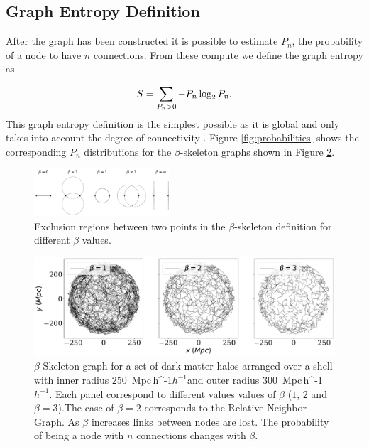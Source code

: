 \documentclass[fleqn,usenatbib]{mnras}
\newcommand{\Mpch}{\,{\rm Mpc}\,\ifmmode h^{-1}\else $h^{-1}$\fi}
\begin{document}
\subsection{Graph Entropy Definition}

After the graph has been constructed it is possible to estimate $P_n$, the probability of 
a node to have $n$ connections.
From these compute we define the graph entropy as

\begin{equation}
\centering
    S = \displaystyle\sum_{P_n>0}-P_n\log_2{P_n}.
    \label{ecuacionEntropia}
\end{equation}
%
This graph entropy definition is the simplest possible as it is global and only 
takes into account the degree of connectivity \citep{2012Entrp..14..559M}. 
Figure \ref{fig:probabilities} shows the corresponding $P_n$ distributions for the 
$\beta$-skeleton graphs shown in Figure \ref{fig:connectionsBeta}.




\begin{figure}
    \centering
    \includegraphics[width=0.45\textwidth]{betas.pdf}
   \caption{Exclusion regions between two points in the $\beta$-skeleton definition for
    different $\beta$ values.
 \label{fig:example}}  
\end{figure} 

\begin{figure}
    \centering
    \includegraphics[width=1.0\textwidth]{beta123_2.pdf}
    \caption{$\beta$-Skeleton graph for a set of dark matter halos arranged over a shell
    with inner radius $250$ \Mpch and outer radius $300$ \Mpch.
    Each panel correspond to different values values of $\beta$ ($1$, $2$ and $\beta=3$).The case of $\beta=2$ corresponds to the Relative Neighbor Graph.
    As $\beta$ increases links between nodes are lost. The probability of being a node with $n$ connections changes with $\beta$.}
\label{fig:connectionsBeta}
\end{figure}
\end{document}
